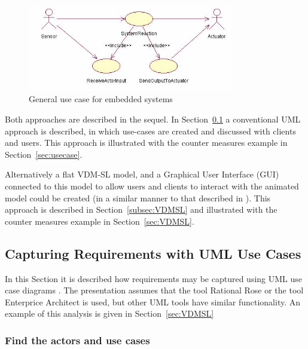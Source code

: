 \documentclass{overturerepchap}
\begin{document}
\begin{figure}
\begin{center}
\includegraphics[width=0.8\textwidth]{figures/generalusecase.jpg}
\end{center}
\caption{General use case for embedded systems}\label{fig:usecase}
\end{figure}

Both approaches are described in the sequel. In
Section~\ref{subsec:capuse} a conventional UML \cite{UML20} approach
is described, in which use-cases are created and discussed with
clients and users. This approach is illustrated with the counter
measures example in Section~\ref{sec:usecase}.

Alternatively a flat VDM-SL model, and a Graphical User Interface
(GUI) connected to this model to allow users and clients to interact
with the animated model could be created (in a similar manner to that
described in \cite{CashPoint}). This approach is described in
Section~\ref{subsec:VDMSL} and illustrated with the counter measures
example in Section~\ref{sec:VDMSL}.

\subsection{Capturing Requirements with UML Use Cases}\label{subsec:capuse}

In this Section it is described how requirements may be captured using
UML use case diagrams \cite{UML20}. The presentation assumes that the
tool Rational Rose \cite{Rose&00} or the tool Enterprice Architect 
is used, but other UML tools have
similar functionality. An example of this analysis is given in
Section~\ref{sec:VDMSL}

\subsubsection{Find the actors and use cases}
\end{document}
